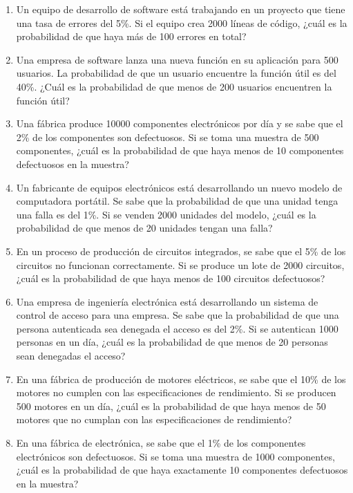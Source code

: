 \begin{Ejer}
\begin{enumerate}
    \item Un equipo de desarrollo de software está trabajando en un proyecto que tiene una tasa de errores del 5\%. Si el equipo crea 2000 líneas de código, ¿cuál es la probabilidad de que haya más de 100 errores en total?

    \item Una empresa de software lanza una nueva función en su aplicación para 500 usuarios. La probabilidad de que un usuario encuentre la función útil es del 40\%. ¿Cuál es la probabilidad de que menos de 200 usuarios encuentren la función útil?

    \item Una fábrica produce 10000 componentes electrónicos por día y se sabe que el 2\% de los componentes son defectuosos. Si se toma una muestra de 500 componentes, ¿cuál es la probabilidad de que haya menos de 10 componentes defectuosos en la muestra?

    \item Un fabricante de equipos electrónicos está desarrollando un nuevo modelo de computadora portátil. Se sabe que la probabilidad de que una unidad tenga una falla es del 1\%. Si se venden 2000 unidades del modelo, ¿cuál es la probabilidad de que menos de 20 unidades tengan una falla?

    \item En un proceso de producción de circuitos integrados, se sabe que el 5\% de los circuitos no funcionan correctamente. Si se produce un lote de 2000 circuitos, ¿cuál es la probabilidad de que haya menos de 100 circuitos defectuosos?

    \item Una empresa de ingeniería electrónica está desarrollando un sistema de control de acceso para una empresa. Se sabe que la probabilidad de que una persona autenticada sea denegada el acceso es del 2\%. Si se autentican 1000 personas en un día, ¿cuál es la probabilidad de que menos de 20 personas sean denegadas el acceso?

    \item En una fábrica de producción de motores eléctricos, se sabe que el 10\% de los motores no cumplen con las especificaciones de rendimiento. Si se producen 500 motores en un día, ¿cuál es la probabilidad de que haya menos de 50 motores que no cumplan con las especificaciones de rendimiento?


    \item En una fábrica de electrónica, se sabe que el 1\% de los componentes electrónicos son defectuosos. Si se toma una muestra de 1000 componentes, ¿cuál es la probabilidad de que haya exactamente 10 componentes defectuosos en la muestra?

\end{enumerate}
\end{Ejer} 


